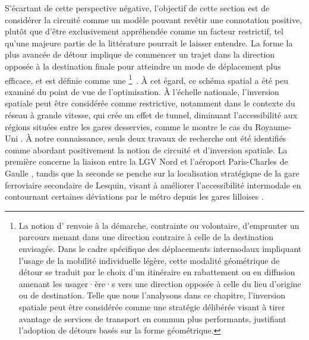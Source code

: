\begin{refsegment}
S'écartant de cette perspective négative, l'objectif de cette section est de considérer la circuité comme un modèle pouvant revêtir une connotation positive, plutôt que d'être exclusivement appréhendée comme un facteur restrictif, tel qu'une majeure partie de la littérature pourrait le laisser entendre. La forme la plus avancée de détour implique de commencer un trajet dans la direction opposée à la destination finale pour atteindre un mode de déplacement plus efficace, et est définie comme une \footnote{
La notion d' renvoie à la démarche, contrainte ou volontaire, d'emprunter un parcours menant dans une direction contraire à celle de la destination envisagée. Dans le cadre spécifique des déplacements intermodaux impliquant l'usage de la mobilité individuelle légère, cette modalité géométrique de détour se traduit par le choix d'un itinéraire en rabattement ou en diffusion amenant les usager·ère·s vers une direction opposée à celle du lieu d'origine ou de destination. Telle que nous l'analysons dans ce chapitre, l'inversion spatiale peut être considérée comme une stratégie délibérée visant à tirer avantage de services de transport en commun plus performants, justifiant l'adoption de détours basés sur la forme géométrique.
}~\textcolor{blue}{\autocite[106]{tobler_map_1961, bunge_theoretical_1966}}. À cet égard, ce schéma spatial a été peu examiné du point de vue de l'optimisation. À l'échelle nationale, l'inversion spatiale peut être considérée comme restrictive, notamment dans le contexte du réseau à grande vitesse, qui crée un effet de tunnel, diminuant l'accessibilité aux régions situées entre les gares desservies, comme le montre le cas du Royaume-Uni \textcolor{blue}{\autocite[112]{martinez_sanchez-mateos_accessibility_2012}}. À notre connaissance, seuls deux travaux de recherche ont été identifiés comme abordant positivement la notion de circuité et d'inversion spatiale. La première concerne la liaison entre la \acrfull{LGV} Nord et l'aéroport Paris-Charles de Gaulle \textcolor{blue}{\autocite[144, 161]{lhostis_detour_2014}}, tandis que la seconde se penche sur la localisation stratégique de la gare ferroviaire secondaire de Lesquin, visant à améliorer l'accessibilité intermodale en contournant certaines déviations par le métro depuis les gares lilloises \textcolor{blue}{\autocite[14-17]{lhostis_definir_2010}}.%


\end{refsegment}

